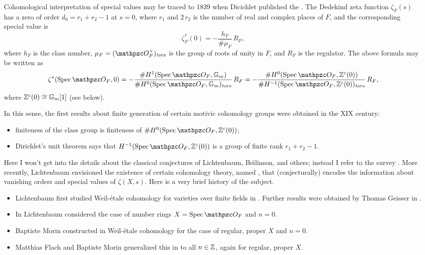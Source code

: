 \documentclass{article}
\theoremstyle{plain}
\begin{document}
Cohomological interpretation of special values may be traced to 1839 when
Dicichlet published the . The Dedekind zeta function
$\zeta_F (s)$ has a zero of order $d_0 = r_1 + r_2 - 1$ at $s = 0$, where $r_1$
and $2\,r_2$ is the number of real and complex places of $F$, and the
corresponding special value is
$$\zeta_F^* (0) = -\frac{h_F}{\#\mu_F}\,R_F,$$
where $h_F$ is the class number, $\mu_F = (\O_F^\times)_\text{\it tors}$ is the
group of roots of unity in $F$, and $R_F$ is the regulator. The above formula
may be written as
\[
  \zeta^* (\Spec \O_F, 0) =
  -\frac{\# H^1 (\Spec \O_F, \mathbb{G}_m)}{\# H^0 (\Spec \O_F, \mathbb{G}_m)_\text{\it tors}}\,R_F =
  -\frac{\# H^0 (\Spec \O_F, \ZZ^c (0))}{\# H^{-1} (\Spec \O_F, \ZZ^c (0))_\text{\it tors}}\,R_F,
\]
where $\mathbb{Z}^c (0) \cong \mathbb{G}_m [1]$ (see below).

\pagebreak

In this sense, the first results about finite generation of certain motivic
cohomology groups were obtained in the XIX century:

\begin{itemize}
\item finiteness of the class group is finiteness of
  $\# H^0 (\Spec \O_F, \ZZ^c (0))$;

\item Dirichlet's unit theorem says that $H^{-1} (\Spec \O_F, \ZZ^c (0))$ is a
  group of finite rank $r_1 + r_2 - 1$.
\end{itemize}

Here I won't get into the details about the classical conjectures of
Lichtenbaum, Be\u{\i}linson, and others; instead I refer to the survey
\cite{Kahn-2005}. More recently, Lichtenbaum envisioned the existence of certain
cohomology theory, named , that (conjecturally)
encodes the information about vanishing orders and special values of
$\zeta (X,s)$. Here is a very brief history of the subject.

\begin{itemize}
\item Lichtenbaum first studied Weil-étale cohomology for varieties over finite
  fields in \cite{Lichtenbaum-05}. Further results were obtained by Thomas
  Geisser in \cite{Geisser-04-finite}.

\item In \cite{Lichtenbaum-09-number-rings} Lichtenbaum considered the case of
  number rings $X = \Spec \O_F$ and $n = 0$.

\item Baptiste Morin constructed in \cite{Morin-14} Weil-étale cohomology for
  the case of regular, proper $X$ and $n = 0$.

\item Matthias Flach and Baptiste Morin generalized this in
  \cite{Flach-Morin-16} to all $n \in \mathbb{Z}$, again for regular, proper $X$.
\end{itemize}
\end{document}

